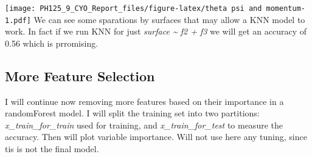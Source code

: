 \documentclass[]{article}
\begin{document}
\texttt{[image: PH125\_9\_CYO\_Report\_files/figure-latex/theta psi and momentum-1.pdf]}
We can see some sparations by surfaces that may allow a KNN model to
work. In fact if we run KNN for just \emph{surface \textasciitilde{} f2
+ f3} we will get an accuracy of 0.56 which is prromising.

\hypertarget{more-feature-selection}{%
\subsection{More Feature Selection}\label{more-feature-selection}}

I will continue now removing more features based on their importance in
a randomForest model. I will split the training set into two partitions:
\emph{x\_train\_for\_train} used for training, and
\emph{x\_train\_for\_test} to measure the accuracy. Then will plot
variable importance. Will not use here any tuning, since tis is not the
final model.
\end{document}
